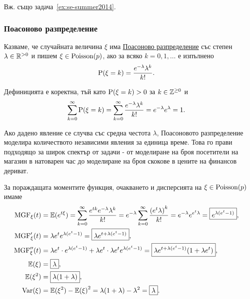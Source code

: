 \documentclass[numbers=endperiod, DIV=15, bibliography=totocnumbered]{scrartcl}
\begin{document}
Вж. също задача~\ref{ex:se-summer2014}.

\subsubsection{Поасоново разпределение}\label{dist:poisson}

\begin{definition}
  Казваме, че случайната величина $\xi$ има \uline{Поасоново разпределение} със степен $\lambda \in \mathbb{R}^{> 0}$ и пишем $\xi \in \operatorname{Poisson}(p)$, ако за всяко $k = 0, 1, \ldots$ е изпълнено
  \begin{displaymath}
    \operatorname{P}(\xi = k) = \frac{e^{-\lambda} \lambda^k} {k!}.
  \end{displaymath}

  Дефиницията е коректна, тъй като $\operatorname{P}(\xi = k) > 0$ за $k \in \mathbb{Z}^{\geq 0}$ и
  \begin{displaymath}
    \sum_{k=0}^\infty \operatorname{P}(\xi = k)
    =
    \sum_{k=0}^\infty \frac{e^{-\lambda} \lambda^k} {k!}
    =
    e^{-\lambda} e^{\lambda}
    =
    1.
  \end{displaymath}
\end{definition}

Ако дадено явление се случва със средна честота $\lambda$, Поасоновото разпределение моделира количеството независими явления за единица време. Това го прави подходящо за широк спектър от задачи - от моделиране на броя посетители на магазин в натоварен час до моделиране на броя скокове в цените на финансов дериват.

За пораждащата моментите функция, очакването и дисперсията на $\xi \in \operatorname{Poisson}(p)$ имаме
\begingroup
\allowdisplaybreaks
\begin{align*}
  \operatorname{MGF}_\xi(t)
  &=
  \mathbb{E}(e^{t\xi})
  =
  \sum_{k=0}^\infty \frac{e^{tk} e^{-\lambda} \lambda^k} {k!}
  =
  e^{-\lambda} \sum_{k=0}^\infty \frac{{(e^t \lambda)}^k} {k!}
  =
  e^{-\lambda} e^{e^t \lambda}
  =
  \boxed{e^{\lambda (e^t - 1)}},
  \\
  \operatorname{MGF}'_\xi(t)
  &=
  \lambda e^t e^{\lambda (e^t - 1)}
  =
  \boxed{\lambda e^{t + \lambda (e^t - 1)}},
  \\
  \operatorname{MGF}''_\xi(t)
  &=
  \lambda e^t \cdot e^{\lambda (e^t - 1)} + \lambda e^t \cdot \lambda e^t e^{\lambda (e^t - 1)}
  =
  \boxed{\lambda e^{t + \lambda (e^t - 1)} (1 + \lambda e^t)},
  \\
  \mathbb{E}(\xi)
  &=
  \boxed{\lambda},
  \\
  \mathbb{E}(\xi^2)
  &=
  \boxed{\lambda(1 + \lambda)},
  \\
  \operatorname{Var}(\xi)
  &=
  \mathbb{E}(\xi^2) - {\mathbb{E}(\xi)}^2
  =
  \lambda(1 + \lambda) - \lambda^2
  =
  \boxed{\lambda}.
\end{align*}
\endgroup
\end{document}
